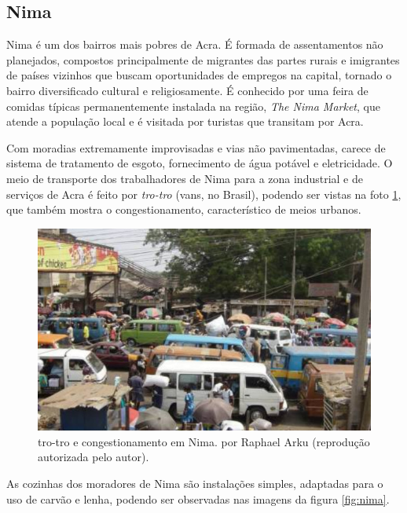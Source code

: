 \subsection{Nima}

Nima é um dos bairros mais pobres de Acra. É formada de assentamentos não 
planejados, compostos principalmente de migrantes das partes rurais e 
imigrantes de países vizinhos que buscam oportunidades de empregos na capital, 
tornado o bairro diversificado cultural e religiosamente. É conhecido por uma 
feira de comidas típicas permanentemente instalada na região,
\textit{The Nima Market}, que atende a população local e é visitada por turistas que 
transitam por Acra.

Com moradias extremamente improvisadas e vias não pavimentadas, carece de 
sistema de tratamento de esgoto, fornecimento de água potável e eletricidade. 
O meio de transporte dos trabalhadores de Nima para a zona industrial e de 
serviços de Acra é feito por \textit{tro-tro} (vans, no Brasil), podendo ser vistas na foto 
\ref{fig:nima_tro}, que também mostra o congestionamento, característico de 
meios urbanos.  

\begin{figure}[H]
  \centering
    \includegraphics[width=0.5\linewidth]{../inputs/images/zheng/arku4.jpeg}
    \caption{tro-tro e congestionamento em Nima. por Raphael Arku 
           (reprodução autorizada pelo autor). \label{fig:nima_tro}}
\end{figure}

As cozinhas dos moradores de Nima são instalações simples, adaptadas para o uso
de carvão e lenha, podendo ser observadas nas imagens da figura \ref{fig:nima}.

